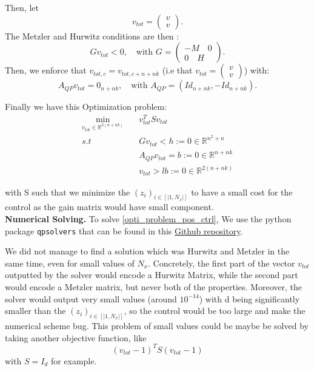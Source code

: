 \documentclass[12pt]{article}
\begin{document}
Then, let $$v_{tot} = \begin{pmatrix}v\\v\end{pmatrix}.$$
The Metzler and Hurwitz conditions are then : $$Gv_{tot} <0, \quad \text{with }G = \begin{pmatrix}-M\quad 0 \\ 0 \quad H\end{pmatrix}.$$Then, we enforce that $v_{tot, c} = v_{tot, c+n+nk}$ (i.e that $v_{tot} = \begin{pmatrix}v\\v\end{pmatrix}$) with: $$A_{QP}v_{tot} = 0_{n+nk},\quad \text{with } A_{QP}= (Id_{n+nk},-Id_{n+nk}).$$


Finally we have this Optimization problem: 
\begin{equation}\label{opti_problem_pos_ctrl}
\begin{aligned}
\min_{v_{tot}\in \mathbb{R}^{2(n+nk)}}\quad &v_{tot}^TSv_{tot}\\
s.t \quad &Gv_{tot} <h:=0\in\mathbb{R}^{n^2+n} \\
&A_{QP}v_{tot}= b:=0 \in \mathbb{R}^{n+nk}\\
&v_{tot} > lb:=0 \in \mathbb{R}^{2(n+nk)}
\end{aligned}    
\end{equation}

with S such that we minimize the $(z_i)_{i\in[|1,N_x|]}$ to have a small cost for the control as the gain matrix would have small component.\\


\textbf{Numerical Solving.} To solve \eqref{opti_problem_pos_ctrl}, We use the python package \texttt{qpsolvers} that can be found in this \href{https://github.com/qpsolvers/qpsolvers}{Github repository}. 

We did not manage to find a solution which was Hurwitz and Metzler in the same time, even for small values of $N_x$. Concretely, the first part of the vector $v_{tot}$ outputted by the solver would encode a Hurwitz Matrix, while the second part would encode a Metzler matrix, but never both of the properties. Moreover, the solver would output very small values (around $10^{-14}$) with d being significantly smaller than the $(z_i)_{i\in[|1,N_x|]}$, so the control would be too large and make the numerical scheme bug. This problem of small values could be maybe be solved by taking another objective function, like $$(v_{tot}-1)^TS(v_{tot}-1)$$ 
with $S=I_d$ for example. 
\end{document}

